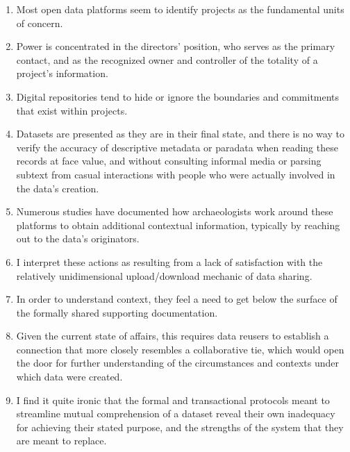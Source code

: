 \documentclass[12pt]{article}
\begin{document}
\begin{enumerate}
  \item Most open data platforms seem to identify projects as the fundamental units of concern.
  \item Power is concentrated in the directors' position, who serves as the primary contact, and as the recognized owner and controller of the totality of a project's information.
  \item Digital repositories tend to hide or ignore the boundaries and commitments that exist within projects.
  \item Datasets are presented as they are in their final state, and there is no way to verify the accuracy of descriptive metadata or paradata when reading these records at face value, and without consulting informal media or parsing subtext from casual interactions with people who were actually involved in the data's creation.
  \item Numerous studies have documented how archaeologists work around these platforms to obtain additional contextual information, typically by reaching out to the data's originators.
  \item I interpret these actions as resulting from a lack of satisfaction with the relatively unidimensional upload/download mechanic of data sharing.
  \item In order to understand context, they feel a need to get below the surface of the formally shared supporting documentation.
  \item Given the current state of affairs, this requires data reusers to establish a connection that more closely resembles a collaborative tie, which would open the door for further understanding of the circumstances and contexts under which data were created.
  \item I find it quite ironic that the formal and transactional protocols meant to streamline mutual comprehension of a dataset reveal their own inadequacy for achieving their stated purpose, and the strengths of the system that they are meant to replace.
\end{enumerate}
\end{document}
